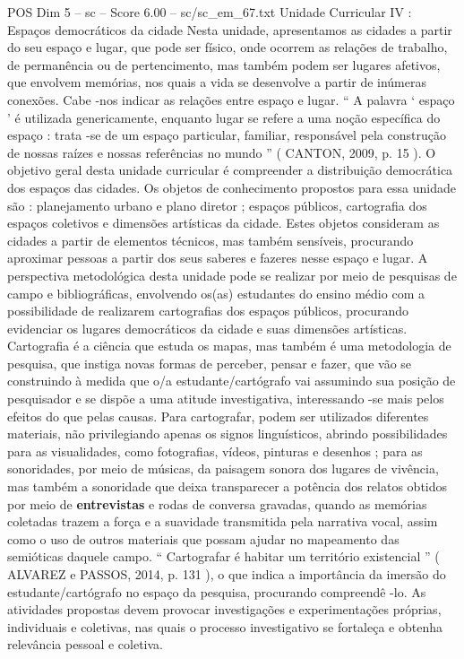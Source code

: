 \begin{textsample}{POS Dim 5 – sc – Score 6.00 – sc/sc\_em\_67.txt}
Unidade Curricular IV : Espaços democráticos da cidade Nesta unidade, apresentamos as cidades a partir do seu espaço e lugar, que pode ser físico, onde ocorrem as relações de trabalho, de permanência ou de pertencimento, mas também podem ser lugares afetivos, que envolvem memórias, nos quais a vida se desenvolve a partir de inúmeras conexões.
Cabe -nos indicar as relações entre espaço e lugar. “ A palavra ‘ espaço ’ é utilizada genericamente, enquanto lugar se refere a uma noção específica do espaço : trata -se de um espaço particular, familiar, responsável pela construção de nossas raízes e nossas referências no mundo ” ( CANTON, 2009, p. 15 ).
O objetivo geral desta unidade curricular é compreender a distribuição democrática dos espaços das cidades.
Os objetos de conhecimento propostos para essa unidade são : planejamento urbano e plano diretor ; espaços públicos, cartografia dos espaços coletivos e dimensões artísticas da cidade.
Estes objetos consideram as cidades a partir de elementos técnicos, mas também sensíveis, procurando aproximar pessoas a partir dos seus saberes e fazeres nesse espaço e lugar.
A perspectiva metodológica desta unidade pode se realizar por meio de pesquisas de campo e bibliográficas, envolvendo os(as) estudantes do ensino médio com a possibilidade de realizarem cartografias dos espaços públicos, procurando evidenciar os lugares democráticos da cidade e suas dimensões artísticas.
Cartografia é a ciência que estuda os mapas, mas também é uma metodologia de pesquisa, que instiga novas formas de perceber, pensar e fazer, que vão se construindo à medida que o/a estudante/cartógrafo vai assumindo sua posição de pesquisador e se dispõe a uma atitude investigativa, interessando -se mais pelos efeitos do que pelas causas.
Para cartografar, podem ser utilizados diferentes materiais, não privilegiando apenas os signos linguísticos, abrindo possibilidades para as visualidades, como fotografias, vídeos, pinturas e desenhos ; para as sonoridades, por meio de músicas, da paisagem sonora dos lugares de vivência, mas também a sonoridade que deixa transparecer a potência dos relatos obtidos por meio de \textbf{entrevistas} e rodas de conversa gravadas, quando as memórias coletadas trazem a força e a suavidade transmitida pela narrativa vocal, assim como o uso de outros materiais que possam ajudar no mapeamento das semióticas daquele campo. “ Cartografar é habitar um território existencial ” ( ALVAREZ e PASSOS, 2014, p. 131 ), o que indica a importância da imersão do estudante/cartógrafo no espaço da pesquisa, procurando compreendê -lo.
As atividades propostas devem provocar investigações e experimentações próprias, individuais e coletivas, nas quais o processo investigativo se fortaleça e obtenha relevância pessoal e coletiva.

\end{textsample}
